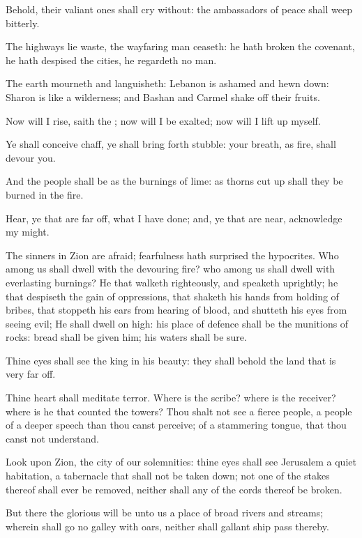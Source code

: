 \Verse Behold, their valiant ones shall cry without: the ambassadors of peace shall weep bitterly.

\Verse The highways lie waste, the wayfaring man ceaseth: he hath broken the covenant, he hath despised the cities, he regardeth no man.

\Verse The earth mourneth and languisheth: Lebanon is ashamed and hewn down: Sharon is like a wilderness; and Bashan and Carmel shake off their fruits.

\Verse Now will I rise, saith the \LORD; now will I be exalted; now will I lift up myself.

\Verse Ye shall conceive chaff, ye shall bring forth stubble: your breath, as fire, shall devour you.

\Verse And the people shall be as the burnings of lime: as thorns cut up shall they be burned in the fire.

\Verse Hear, ye that are far off, what I have done; and, ye that are near, acknowledge my might.

\Verse The sinners in Zion are afraid; fearfulness hath surprised the hypocrites. Who among us shall dwell with the devouring fire? who among us shall dwell with everlasting burnings?  \Verse He that walketh righteously, and speaketh uprightly; he that despiseth the gain of oppressions, that shaketh his hands from holding of bribes, that stoppeth his ears from hearing of blood, and shutteth his eyes from seeing evil; \Verse He shall dwell on high: his place of defence shall be the munitions of rocks: bread shall be given him; his waters shall be sure.

\Verse Thine eyes shall see the king in his beauty: they shall behold the land that is very far off.

\Verse Thine heart shall meditate terror. Where is the scribe? where is the receiver? where is he that counted the towers?  \Verse Thou shalt not see a fierce people, a people of a deeper speech than thou canst perceive; of a stammering tongue, that thou canst not understand.

\Verse Look upon Zion, the city of our solemnities: thine eyes shall see Jerusalem a quiet habitation, a tabernacle that shall not be taken down; not one of the stakes thereof shall ever be removed, neither shall any of the cords thereof be broken.

\Verse But there the glorious \LORD will be unto us a place of broad rivers and streams; wherein shall go no galley with oars, neither shall gallant ship pass thereby.

